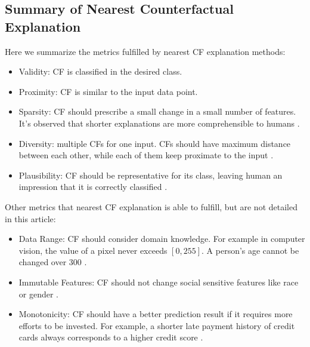 \subsection{Summary of Nearest Counterfactual Explanation}
Here we summarize the metrics fulfilled by nearest CF explanation methods:
 \begin{itemize}
 \item Validity: CF is classified in the desired class.
 \item Proximity: CF is similar to the input data point.
   \item  Sparsity: CF should prescribe a small change in a small number of features. It's observed that shorter explanations are more comprehensible to humans \cite{CFReview}. %
   \item  Diversity: multiple CFs for one input. CFs should have maximum distance between each other, while each of them keep proximate to the input \cite{russellDiverse,DiCE,certifai}.
   \item  Plausibility: CF should be representative for its class, leaving human an impression that it is correctly classified \cite{prototype,FACE}.
 \end{itemize}
 Other metrics that nearest CF explanation is able to fulfill, but are not detailed in this article:
 \begin{itemize}
   \item Data Range: CF should consider domain knowledge. For example in computer vision, the value of a pixel never exceeds $[0,255]$. A person's age cannot be changed over 300 \cite{certifai}.
   \item Immutable Features: CF should not change social sensitive features like race or gender \cite{certifai}.
   \item Monotonicity: CF should have a better prediction result if it requires more efforts to be invested. For example, a shorter late payment history of credit cards always corresponds to a higher credit score \cite{russellDiverse}.
 \end{itemize}
